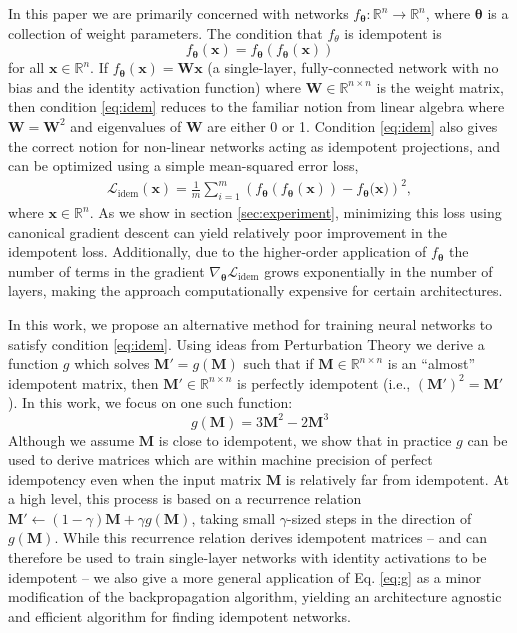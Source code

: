 \documentclass{article}
\newcommand{\vx}{\mathbf{x}}
\newcommand{\vM}{\mathbf{M}}
\newcommand{\vW}{\mathbf{W}}
\newcommand{\vtheta}{\bm{\theta}}
\begin{document}
In this paper we are primarily concerned with networks $f_{\vtheta}: \mathbb{R}^n \to \mathbb{R}^n$, where $\vtheta$ is a collection of weight parameters. The condition that $f_{\theta}$ is idempotent is
%
\begin{equation}
  f_{\vtheta}(\vx) = f_{\vtheta}(f_{\vtheta}(\vx))
  \label{eq:idem}
\end{equation}
%
for all $\vx \in \mathbb{R}^n$. If $f_{\vtheta}(\vx) = \vW \vx$ (a single-layer, fully-connected network with no bias and the identity activation function) where $\vW \in \mathbb{R}^{n \times n}$ is the weight matrix, then condition \ref{eq:idem} reduces to the familiar notion from linear algebra where $\vW = \vW^2$ and eigenvalues of $\vW$ are either 0 or 1. Condition \ref{eq:idem} also gives the correct notion for non-linear networks acting as idempotent projections, and can be optimized using a simple mean-squared error loss,
%
\begin{align}
  \mathcal{L}_\text{idem}(\vx) = \frac{1}{m} \sum_{i = 1}^m \left(f_{\vtheta}(f_{\vtheta}(\vx)) - f_{\vtheta}\big(\vx \big)\right)^2,
  \label{eq:idem-loss}
\end{align}
%
where $\vx \in \mathbb{R}^{n}$. As we show in section \ref{sec:experiment}, minimizing this loss using canonical gradient descent can yield relatively poor improvement in the idempotent loss. Additionally, due to the higher-order application of $f_{\vtheta}$ the number of terms in the gradient $\nabla_{\vtheta} \mathcal{L}_{\text{idem}}$ grows exponentially in the number of layers, making the approach computationally expensive for certain architectures.

In this work, we propose an alternative method for training neural networks to satisfy condition \ref{eq:idem}. Using ideas from Perturbation Theory \cite{intro-pertub-theory} we derive a function $g$ which solves $\vM' = g(\vM)$ such that if $\vM \in \mathbb{R}^{n \times n}$ is an ``almost'' idempotent matrix, then $\vM' \in \mathbb{R}^{n \times n}$ is perfectly idempotent (i.e., $(\vM')^2 = \vM'$). In this work, we focus on one such function:
%
\begin{equation}
  g(\vM) = 3 \vM^2 - 2 \vM^3
  \label{eq:g}
\end{equation}
%
Although we assume $\vM$ is close to idempotent, we show that in practice $g$ can be used to derive matrices which are within machine precision of perfect idempotency even when the input matrix $\vM$ is relatively far from idempotent. At a high level, this process is based on a recurrence relation ${\vM' \leftarrow (1 - \gamma)\vM + \gamma g(\vM)}$, taking small $\gamma$-sized steps in the direction of $g(\vM)$. While this recurrence relation derives idempotent matrices -- and can therefore be used to train single-layer networks with identity activations to be idempotent -- we also give a more general application of Eq. \ref{eq:g} as a minor modification of the backpropagation algorithm, yielding an architecture agnostic and efficient algorithm for finding idempotent networks.
\end{document}
